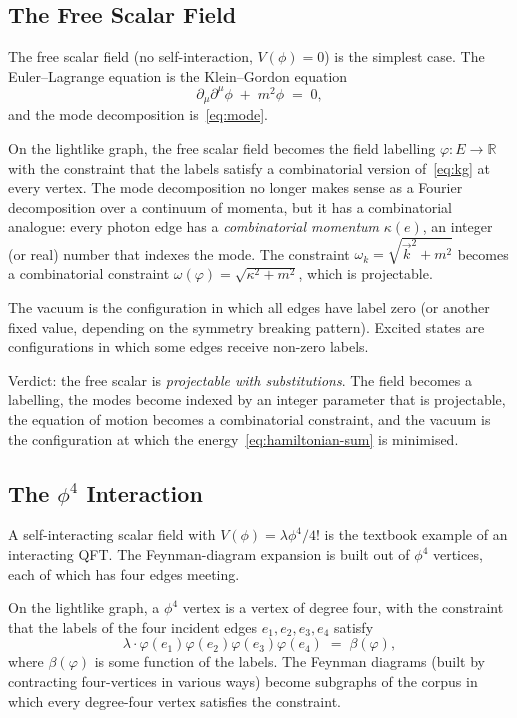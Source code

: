 \documentclass[11pt]{article}
\begin{document}
\subsection{The Free Scalar Field}

The free scalar field (no self-interaction, $V(\phi) = 0$) is the simplest case. The Euler--Lagrange equation is the Klein--Gordon equation
\begin{equation}
\partial_\mu \partial^\mu \phi \;+\; m^2 \phi \;=\; 0,
\label{eq:kg}
\end{equation}
and the mode decomposition is~\eqref{eq:mode}.

On the lightlike graph, the free scalar field becomes the field labelling $\varphi : E \to \mathbb{R}$ with the constraint that the labels satisfy a combinatorial version of~\eqref{eq:kg} at every vertex. The mode decomposition no longer makes sense as a Fourier decomposition over a continuum of momenta, but it has a combinatorial analogue: every photon edge has a \emph{combinatorial momentum} $\kappa(e)$, an integer (or real) number that indexes the mode. The constraint $\omega_k = \sqrt{\vec{k}^2 + m^2}$ becomes a combinatorial constraint $\omega(\varphi) = \sqrt{\kappa^2 + m^2}$, which is projectable.

The vacuum is the configuration in which all edges have label zero (or another fixed value, depending on the symmetry breaking pattern). Excited states are configurations in which some edges receive non-zero labels.

Verdict: the free scalar is \emph{projectable with substitutions}. The field becomes a labelling, the modes become indexed by an integer parameter that is projectable, the equation of motion becomes a combinatorial constraint, and the vacuum is the configuration at which the energy~\eqref{eq:hamiltonian-sum} is minimised.

\subsection{The $\phi^4$ Interaction}

A self-interacting scalar field with $V(\phi) = \lambda \phi^4/4!$ is the textbook example of an interacting QFT. The Feynman-diagram expansion is built out of $\phi^4$ vertices, each of which has four edges meeting.

On the lightlike graph, a $\phi^4$ vertex is a vertex of degree four, with the constraint that the labels of the four incident edges $e_1, e_2, e_3, e_4$ satisfy
\begin{equation}
\lambda \cdot \varphi(e_1)\varphi(e_2)\varphi(e_3)\varphi(e_4) \;=\; \beta(\varphi),
\label{eq:phi4}
\end{equation}
where $\beta(\varphi)$ is some function of the labels. The Feynman diagrams (built by contracting four-vertices in various ways) become subgraphs of the corpus in which every degree-four vertex satisfies the constraint.
\end{document}
